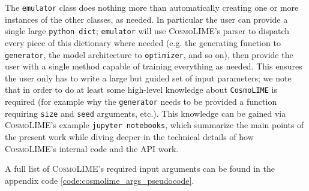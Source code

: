 The \texttt{emulator} class does nothing more than automatically creating one or more instances of the other classes, as needed. In particular the user can provide a single large \texttt{python dict}; \texttt{emulator} will use \textsc{CosmoLIME}'s parser to dispatch every piece of this dictionary where needed (e.g. the generating function to \texttt{generator}, the model architecture to \texttt{optimizer}, and so on), then provide the user with a single method capable of training everything as needed. This ensures the user only has to write a large but guided set of input parameters; we note that in order to do at least some high-level knowledge about \texttt{CosmoLIME} is required (for example why the \texttt{generator} needs to be provided a function requiring \texttt{size} and \texttt{seed} arguments, etc.). This knowledge can be gained via \textsc{CosmoLIME}'s example \texttt{jupyter notebooks}, which summarize the main points of the present work while diving deeper in the technical details of how \textsc{CosmoLIME}'s internal code and the API work.

A full list of \textsc{CosmoLIME}'s required input arguments can be found in the appendix code \ref{code:cosmolime_args_pseudocode}. 

